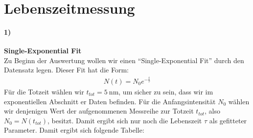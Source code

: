 \newpage
\section{Lebenszeitmessung}
\label{sec:lebenszeit}
\paragraph{1)}\textbf{Single-Exponential Fit}\\
Zu Beginn der Auswertung wollen wir einen \enquote{Single-Exponential Fit} durch den Datensatz legen. Dieser Fit hat die Form:
\begin{gather}
    N(t) = N_0e^{-\frac{t}{\tau}}
\end{gather}
Für die Totzeit wählen wir $t_{tot}=\SI{5}{\nano\metre}$, um sicher zu sein, dass wir im exponentiellen Abschnitt er Daten befinden. Für die Anfangsintensität $N_0$ wählen wir denjenigen Wert der aufgenommenen Messreihe zur Totzeit $t_{tot}$, also $N_0=N(t_{tot})$, besitzt. Damit ergibt sich nur noch die Lebenszeit $\tau$ als gefitteter Parameter. Damit ergibt sich folgende Tabelle:

